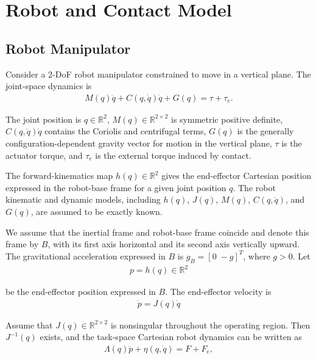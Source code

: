 \documentclass[10pt,journal,letterpaper]{IEEEtran}
\begin{document}
\section{Robot and Contact Model}\label{sec:model}
\subsection{Robot Manipulator}

Consider a 2-DoF robot manipulator constrained to move in a vertical plane. The joint-space dynamics is
\begin{align*}
M(q)\ddot q + C(q,\dot q)\dot q + G(q)
=
\tau + \tau_e .
\end{align*}

The joint position is $q\in\mathbb R^{2}$, $M(q)\in\mathbb R^{2\times 2}$ is symmetric positive definite, $C(q,\dot q)\dot q$ contains the Coriolis and centrifugal terms, $G(q)$ is the generally configuration-dependent gravity vector for motion in the vertical plane, $\tau$ is the actuator torque, and $\tau_e$ is the external torque induced by contact.

The forward-kinematics map $h(q)\in\mathbb R^2$ gives the end-effector Cartesian position expressed in the robot-base frame for a given joint position $q$. The robot kinematic and dynamic models, including $h(q)$, $J(q)$, $M(q)$, $C(q,\dot q)$, and $G(q)$, are assumed to be exactly known.

We assume that the inertial frame and robot-base frame coincide and denote this frame by $B$, with its first axis horizontal and its second axis vertically upward. The gravitational acceleration expressed in $B$ is $g_B=[0\;-g]^T$, where $g>0$. Let
\begin{equation}\label{eq:position}
\begin{aligned}
p=h(q)\in\mathbb R^{2}
\end{aligned}
\end{equation}

be the end-effector position expressed in $B$. The end-effector velocity is
\begin{equation}\label{eq:velocity}
\begin{aligned}
\dot p = J(q)\dot q
\end{aligned}
\end{equation}

Assume that $J(q)\in\mathbb R^{2\times 2}$ is nonsingular throughout the operating region. Then $J^{-1}(q)$ exists, and the task-space Cartesian robot dynamics can be written as
\begin{equation}\label{eq:cartesian-dynamics}
\begin{aligned}
\Lambda(q)\ddot p+\eta(q,\dot q)=F+F_e,
\end{aligned}
\end{equation}
\end{document}
